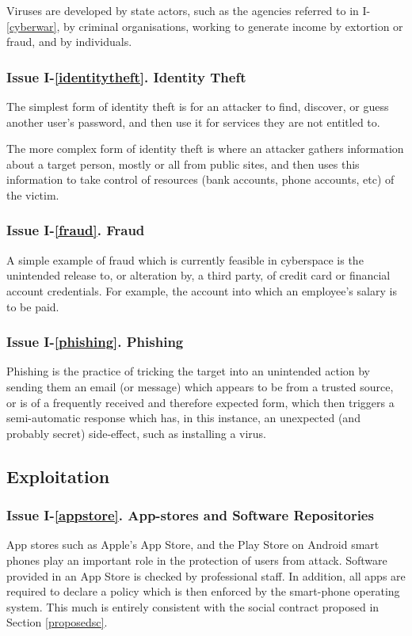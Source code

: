 Viruses are developed by state actors, such as the agencies
referred to in I-\ref{cyberwar}, by criminal organisations, working
to generate income by extortion or fraud, and by individuals.

\subsubsection*{Issue I-\ref{identitytheft}. {Identity Theft}}\label{identitytheftsol}
%
The simplest form of identity theft is for an attacker to find, discover,
or guess another user's password, and then use it for services
they are not entitled to. 

The more complex form of identity theft is where an attacker gathers
information about a target person, mostly or all from public
sites, and then uses this information to take control of resources
(bank accounts, phone accounts, etc) of the victim. 

\subsubsection*{Issue I-\ref{fraud}. {Fraud}}\label{fraudsol}
%
A simple example of fraud which is currently feasible in cyberspace is
the unintended release to, or alteration by, a third party, of credit card or financial account
credentials. For example, the account into which an employee's salary is to
be paid.

\subsubsection*{Issue I-\ref{phishing}. {Phishing}}\label{phishingsol}
%
Phishing is the practice of tricking the target into an unintended action
by sending them an email (or message) which appears to be from a trusted
source, or is of a frequently received and therefore expected form, which
then triggers a semi-automatic response which has, in this instance, an
unexpected (and probably secret) side-effect, such as installing a virus.

\subsection{Exploitation}\label{exploitationsec}
\subsubsection*{Issue I-\ref{appstore}. {App-stores and Software Repositories}}\label{appstoresol}
%
App stores such as Apple's App Store, and the Play Store on Android smart phones
play an important role in the protection of users from attack. Software
provided in an App Store is checked by professional staff. In addition, all apps
are required to declare a policy which is then enforced by the smart-phone
operating system. This much is entirely consistent with the social contract
proposed in Section \ref{proposedsc}.

